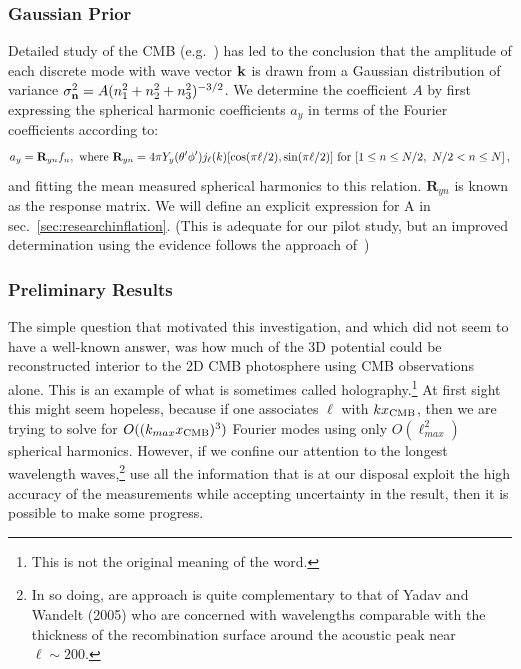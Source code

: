 \documentclass[psfig,11pt]{article}
\begin{document}
\subsubsection{Gaussian Prior}

\label{sec:fnGaussianPrior}

Detailed study of the CMB (e.g.~\cite{Aghanim:2015xee, Ade:2015ava}) has led to the conclusion that the amplitude of each discrete mode with wave vector $\bf k$ is drawn from a Gaussian distribution of variance $\sigma_{\bf n}^2=A(n_1^2+n_2^2+n_3^2)^{-3/2}$. We determine the coefficient $A$ by first expressing the spherical harmonic coefficients $a_y$ in terms of the Fourier coefficients according to:
\begin{equation}
a_y= \mathbf{R}_{yn}f_n, ~{\rm where}~  \mathbf{R}_{yn}=4\pi Y_y(\theta'\phi')j_\ell(k)[\cos(\pi\ell/2),\sin(\pi\ell/2)]\ {\rm for}\ [1\le n\le N/2,\ N/2<n\le N]\, ,
\end{equation}
and fitting the mean measured spherical harmonics to this relation. $ \mathbf{R}_{yn}$ is known as the response matrix. We will define an explicit expression for A in sec.~\ref{sec:researchinflation}. (This is adequate for our pilot study, but an improved determination using the evidence follows the approach of~\cite{Suyu2006})

\subsubsection{Preliminary Results}

The simple question that motivated this investigation, and which did not seem to have a well-known answer, was how much of the 3D potential could be reconstructed interior to the 2D CMB photosphere using CMB observations alone. This is an example of what is sometimes called holography.\footnote{This is not the original meaning of the word.}  At first sight this might seem hopeless, because if one associates $\ell$ with $kx_{\rm CMB}$, then we are trying to solve for $O((k_{max}x_{\rm CMB})^3)$ Fourier modes using only $O(\ell_{max}^2)$ spherical harmonics. However, if we confine our attention to the longest wavelength waves,\footnote{In so doing, are approach is quite complementary to that of Yadav and Wandelt (2005) who are concerned with wavelengths comparable with the thickness of the recombination surface around the acoustic peak near $\ell\sim200$.} use all the information that is at our disposal exploit the high accuracy of the measurements while accepting uncertainty in the result, then it is possible to make some progress.
\end{document}
